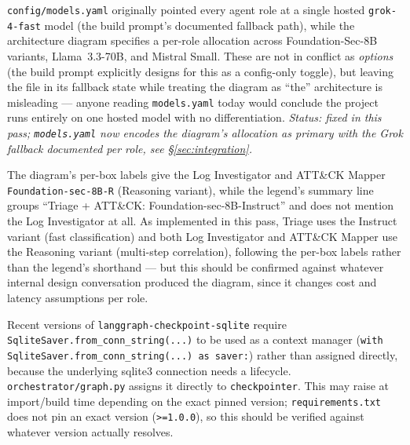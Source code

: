 \documentclass[11pt]{article}
\newenvironment{bugbox}[1]{%
  \begin{tcolorbox}[colback=bugred!5,colframe=bugred!70!black,title=\textbf{#1},fonttitle=\bfseries,boxrule=0.6pt]
}{\end{tcolorbox}}
\begin{document}
\begin{bugbox}{Bug 2 --- \texttt{model\_id} defaults contradict the architecture diagram}
\texttt{config/models.yaml} originally pointed every agent role at a single hosted \texttt{grok-4-fast} model (the build prompt's documented fallback path), while the architecture diagram specifies a per-role allocation across Foundation-Sec-8B variants, Llama~3.3-70B, and Mistral Small. These are not in conflict as \emph{options} (the build prompt explicitly designs for this as a config-only toggle), but leaving the file in its fallback state while treating the diagram as ``the'' architecture is misleading --- anyone reading \texttt{models.yaml} today would conclude the project runs entirely on one hosted model with no differentiation. \textit{Status: fixed in this pass; \texttt{models.yaml} now encodes the diagram's allocation as primary with the Grok fallback documented per role, see \S\ref{sec:integration}.}
\end{bugbox}

\begin{bugbox}{Bug 3 --- Internal inconsistency inside the diagram itself}
The diagram's per-box labels give the Log Investigator and ATT\&CK Mapper \texttt{Foundation-sec-8B-R} (Reasoning variant), while the legend's summary line groups ``Triage + ATT\&CK: Foundation-sec-8B-Instruct'' and does not mention the Log Investigator at all. As implemented in this pass, Triage uses the Instruct variant (fast classification) and both Log Investigator and ATT\&CK Mapper use the Reasoning variant (multi-step correlation), following the per-box labels rather than the legend's shorthand --- but this should be confirmed against whatever internal design conversation produced the diagram, since it changes cost and latency assumptions per role.
\end{bugbox}

\begin{bugbox}{Bug 4 --- \texttt{SqliteSaver.from\_conn\_string} usage may not match the installed \texttt{langgraph-checkpoint-sqlite} API}
Recent versions of \texttt{langgraph-checkpoint-sqlite} require \texttt{SqliteSaver.from\_conn\_string(...)} to be used as a context manager (\texttt{with SqliteSaver.from\_conn\_string(...) as saver:}) rather than assigned directly, because the underlying sqlite3 connection needs a lifecycle. \texttt{orchestrator/graph.py} assigns it directly to \texttt{checkpointer}. This may raise at import/build time depending on the exact pinned version; \texttt{requirements.txt} does not pin an exact version (\texttt{>=1.0.0}), so this should be verified against whatever version actually resolves.
\end{bugbox}
\end{document}
